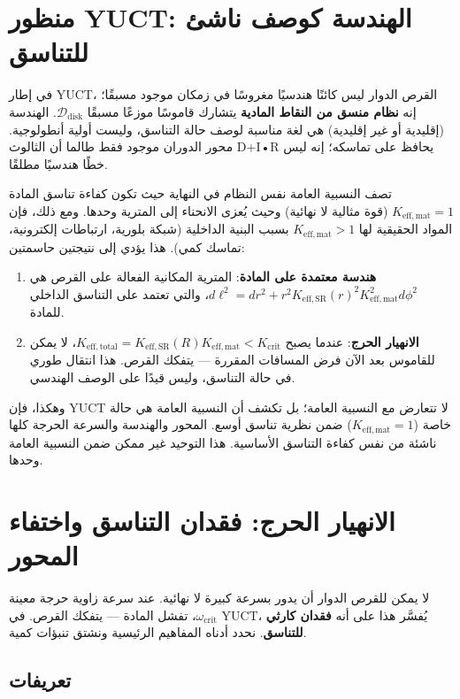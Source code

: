 \documentclass[12pt,a4paper]{article}
\newcommand{\Keffmat}{K_{\mathrm{eff,mat}}}
\newcommand{\Kefftot}{K_{\mathrm{eff,total}}}
\newcommand{\KeffSR}{K_{\mathrm{eff,SR}}}
\newcommand{\Kcrit}{K_{\mathrm{crit}}}
\begin{document}
	\section{منظور YUCT: الهندسة كوصف ناشئ للتناسق}
	
	في إطار YUCT، القرص الدوار ليس كائنًا هندسيًا مغروسًا في زمكان موجود مسبقًا؛ إنه \textbf{نظام منسق من النقاط المادية} يتشارك قاموسًا موزعًا مسبقًا \(\mathcal{D}_{\text{disk}}\). الهندسة (إقليدية أو غير إقليدية) هي لغة مناسبة لوصف حالة التناسق، وليست أولية أنطولوجية. محور الدوران موجود فقط طالما أن الثالوث D+I•R يحافظ على تماسكه؛ إنه ليس خطًا هندسيًا مطلقًا.
	
	تصف النسبية العامة نفس النظام في النهاية حيث تكون كفاءة تناسق المادة \(K_{\mathrm{eff,mat}} = 1\) (قوة مثالية لا نهائية) وحيث يُعزى الانحناء إلى المترية وحدها. ومع ذلك، فإن المواد الحقيقية لها \(K_{\mathrm{eff,mat}} > 1\) بسبب البنية الداخلية (شبكة بلورية، ارتباطات إلكترونية، تماسك كمي). هذا يؤدي إلى نتيجتين حاسمتين:
	
	\begin{enumerate}
		\item \textbf{هندسة معتمدة على المادة}: المترية المكانية الفعالة على القرص هي \(d\ell^2 = dr^2 + r^2 K_{\mathrm{eff,SR}}(r)^2 K_{\mathrm{eff,mat}}^2 d\phi^2\)، والتي تعتمد على التناسق الداخلي للمادة.
		\item \textbf{الانهيار الحرج}: عندما يصبح \(\Kefftot = \KeffSR(R) \Keffmat < \Kcrit\)، لا يمكن للقاموس بعد الآن فرض المسافات المقررة — يتفكك القرص. هذا انتقال طوري في حالة التناسق، وليس قيدًا على الوصف الهندسي.
	\end{enumerate}
	
	وهكذا، فإن YUCT لا تتعارض مع النسبية العامة؛ بل تكشف أن النسبية العامة هي حالة خاصة (\(\Keffmat=1\)) ضمن نظرية تناسق أوسع. المحور والهندسة والسرعة الحرجة كلها ناشئة من نفس كفاءة التناسق الأساسية. هذا التوحيد غير ممكن ضمن النسبية العامة وحدها.
	
	\section{الانهيار الحرج: فقدان التناسق واختفاء المحور}
	\label{sec:critical-disruption}
	
	لا يمكن للقرص الدوار أن يدور بسرعة كبيرة لا نهائية. عند سرعة زاوية حرجة معينة \(\omega_{\text{crit}}\)، تفشل المادة — يتفكك القرص. في YUCT، يُفسَّر هذا على أنه \textbf{فقدان كارثي للتناسق}. نحدد أدناه المفاهيم الرئيسية ونشتق تنبؤات كمية.
	
	\subsection{تعريفات}
	
\end{document}
